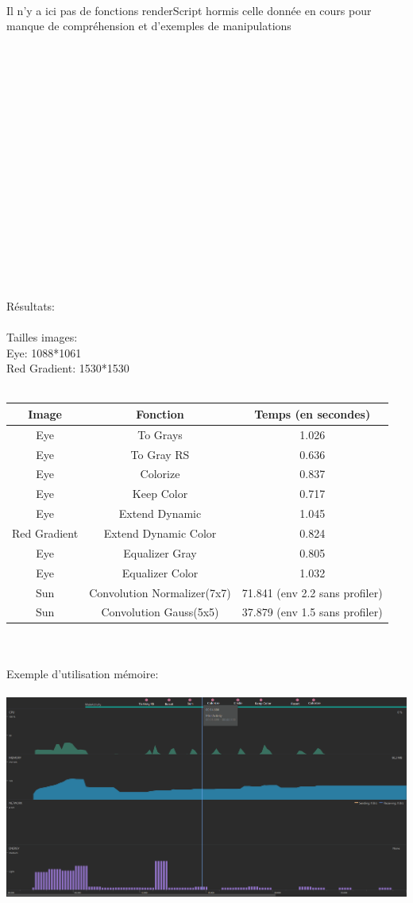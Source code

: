 \documentclass[12pt]{article}
\begin{document}
\\
Il n'y a ici pas de fonctions renderScript hormis celle donnée en cours pour manque de compréhension et d'exemples de manipulations\\
\\
\\
\\
\\
\\
\\
\\
\\
\\
\\
\\
\\
\\
\\
\\
\\
\\
Résultats:\\
\\
Tailles images:\\
Eye: 1088*1061\\
Red Gradient: 1530*1530\\
\\
\begin{tabular}{| c | c | c |}
    \hline
    Image & Fonction & Temps (en secondes)\\ \hline
    Eye & To Grays & 1.026 \\ \hline
    Eye & To Gray RS & 0.636 \\ \hline
    Eye & Colorize & 0.837 \\ \hline
    Eye & Keep Color & 0.717 \\ \hline
    Eye & Extend Dynamic & 1.045 \\ \hline
    Red Gradient & Extend Dynamic Color & 0.824 \\ \hline
    Eye & Equalizer Gray & 0.805 \\ \hline
    Eye & Equalizer Color & 1.032 \\ \hline
    Sun & Convolution Normalizer(7x7) & 71.841 (env 2.2 sans profiler) \\ \hline
    Sun & Convolution Gauss(5x5) & 37.879 (env 1.5 sans profiler) \\ \hline
\end{tabular}
\\
\\
Exemple d'utilisation mémoire:\\
\\

\includegraphics[width=\linewidth]{profilerimg.png}
\end{document}
